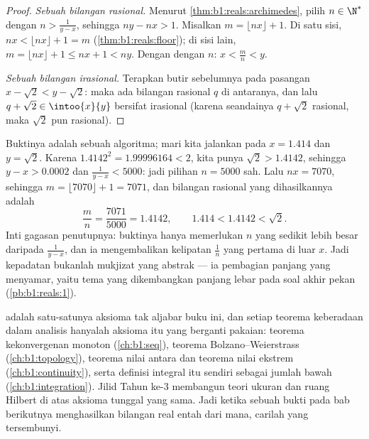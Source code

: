 \begin{proof}
\emph{Sebuah bilangan rasional.} Menurut \cref{thm:b1:reals:archimedes}, pilih $n \in
\N^*$ dengan $n > \frac{1}{y - x}$, sehingga $ny - nx > 1$. Misalkan $m = \lfloor
nx \rfloor + 1$. Di satu sisi, $nx < \lfloor nx \rfloor + 1 = m$
(\cref{thm:b1:reals:floor}); di sisi lain, $m = \lfloor nx \rfloor +
1 \leq nx + 1 < ny$. Dengan  dengan $n$: $x < \frac mn < y$.

\emph{Sebuah bilangan irasional.} Terapkan butir sebelumnya pada pasangan $x -
\sqrt 2 < y - \sqrt 2$: maka ada bilangan rasional $q$ di antaranya, dan lalu
$q + \sqrt 2 \in \intoo{x}{y}$ bersifat irasional (karena seandainya $q + \sqrt 2$
rasional, maka $\sqrt 2$ pun rasional).
\end{proof}

\begin{example}\label{ex:b1:reals:densityrun}
Buktinya adalah sebuah algoritma; mari kita jalankan pada $x = 1.414$ dan
$y = \sqrt 2$. Karena $1.4142^2 = 1.99996164 < 2$, kita punya $\sqrt 2
> 1.4142$, sehingga $y - x > 0.0002$ dan $\frac{1}{y - x} < 5000$: jadi
pilihan $n = 5000$ sah. Lalu $nx = 7070$, sehingga $m = \lfloor
7070 \rfloor + 1 = 7071$, dan bilangan rasional yang dihasilkannya adalah
\[
\frac{m}{n} = \frac{7071}{5000} = 1.4142,
\qquad
1.414 < 1.4142 < \sqrt 2 .
\]
Inti gagasan penutupnya: buktinya hanya memerlukan $n$ yang sedikit lebih besar daripada
$\frac{1}{y-x}$, dan ia mengembalikan kelipatan $\frac 1n$ yang pertama
di luar $x$. Jadi kepadatan bukanlah mukjizat yang abstrak --- ia
pembagian panjang yang menyamar, yaitu tema yang dikembangkan panjang lebar pada soal akhir
pekan (\cref{pb:b1:reals:1}).
\end{example}

\begin{remark}
 adalah satu-satunya aksioma tak aljabar buku
ini, dan setiap teorema keberadaan dalam analisis hanyalah aksioma itu
yang berganti pakaian: teorema kekonvergenan monoton
(\cref{ch:b1:seq}), teorema Bolzano--Weierstrass
(\cref{ch:b1:topology}), teorema nilai antara dan teorema nilai
ekstrem (\cref{ch:b1:continuity}), serta definisi
integral itu sendiri sebagai  jumlah bawah (\cref{ch:b1:integration}).
Jilid Tahun ke-3 membangun teori ukuran dan ruang Hilbert di atas
aksioma tunggal yang sama. Jadi ketika sebuah bukti pada bab berikutnya menghasilkan
bilangan real entah dari mana, carilah  yang tersembunyi.
\end{remark}

